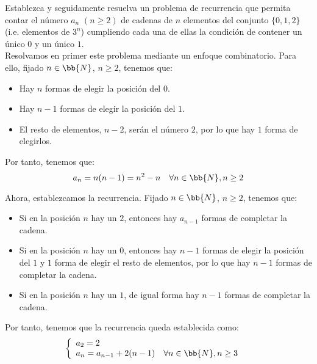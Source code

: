 \documentclass[12pt]{article}
\begin{document}
\begin{ejercicio}
    Establezca y seguidamente resuelva un problema de recurrencia que permita contar el número $a_n$
    $(n \geq 2)$ de cadenas de $n$ elementos del conjunto $\{0, 1, 2\}$ (i.e. elementos de $3^n$) cumpliendo cada
    una de ellas la condición de contener un único $0$ y un único $1$.\\

    Resolvamos en primer este problema mediante un enfoque combinatorio. Para ello, fijado $n\in \bb{N}$, $n\geq 2$, tenemos que:
    \begin{itemize}
        \item Hay $n$ formas de elegir la posición del $0$.
        \item Hay $n-1$ formas de elegir la posición del $1$.
        \item El resto de elementos, $n-2$, serán el número $2$, por lo que hay $1$ forma de elegirlos.
    \end{itemize}

    Por tanto, tenemos que:
    \begin{equation*}
        a_n = n(n-1) = n^2 - n \quad \forall n\in \bb{N}, n\geq 2
    \end{equation*}

    Ahora, establezcamos la recurrencia. Fijado $n\in \bb{N}$, $n\geq 2$, tenemos que:
    \begin{itemize}
        \item Si en la posición $n$ hay un $2$, entonces hay $a_{n-1}$ formas de completar la cadena.
        \item Si en la posición $n$ hay un $0$, entonces hay $n-1$ formas de elegir la posición del $1$ y $1$ forma de elegir el resto de elementos,
        por lo que hay $n-1$ formas de completar la cadena.
        \item Si en la posición $n$ hay un $1$, de igual forma hay $n-1$ formas de completar la cadena.
    \end{itemize}

    Por tanto, tenemos que la recurrencia queda establecida como:
    \begin{equation*}
        \left\{
            \begin{array}{ll}
                a_2 = 2 & \\
                a_n = a_{n-1} + 2(n-1) \quad \forall n\in \bb{N}, n\geq 3
            \end{array}
        \right.
    \end{equation*}


\end{ejercicio}
\end{document}
